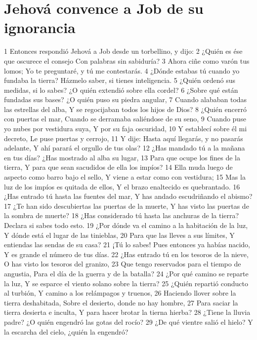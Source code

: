 \section*{Jehová convence a Job de su ignorancia}

1 Entonces respondió Jehová a Job desde un torbellino, y dijo:
2 ¿Quién es ése que oscurece el consejo
Con palabras sin sabiduría?
3 Ahora ciñe como varón tus lomos;
Yo te preguntaré, y tú me contestarás.
4 ¿Dónde estabas tú cuando yo fundaba la tierra?
Házmelo saber, si tienes inteligencia.
5 ¿Quién ordenó sus medidas, si lo sabes?
¿O quién extendió sobre ella cordel?
6 ¿Sobre qué están fundadas sus bases?
¿O quién puso su piedra angular,
7 Cuando alababan todas las estrellas del alba,
Y se regocijaban todos los hijos de Dios?
8 ¿Quién encerró con puertas el mar,
Cuando se derramaba saliéndose de su seno, 
9 Cuando puse yo nubes por vestidura suya,
Y por su faja oscuridad,
10 Y establecí sobre él mi decreto,
Le puse puertas y cerrojo,
11 Y dije: Hasta aquí llegarás, y no pasarás adelante,
Y ahí parará el orgullo de tus olas? 
12 ¿Has mandado tú a la mañana en tus días?
¿Has mostrado al alba su lugar,
13 Para que ocupe los fines de la tierra,
Y para que sean sacudidos de ella los impíos?
14 Ella muda luego de aspecto como barro bajo el sello,
Y viene a estar como con vestidura;
15 Mas la luz de los impíos es quitada de ellos,
Y el brazo enaltecido es quebrantado.
16 ¿Has entrado tú hasta las fuentes del mar,
Y has andado escudriñando el abismo?
17 ¿Te han sido descubiertas las puertas de la muerte,
Y has visto las puertas de la sombra de muerte?
18 ¿Has considerado tú hasta las anchuras de la tierra?
Declara si sabes todo esto.
19 ¿Por dónde va el camino a la habitación de la luz,
Y dónde está el lugar de las tinieblas,
20 Para que las lleves a sus límites,
Y entiendas las sendas de su casa?
21 ¡Tú lo sabes! Pues entonces ya habías nacido,
Y es grande el número de tus días.
22 ¿Has entrado tú en los tesoros de la nieve,
O has visto los tesoros del granizo,
23 Que tengo reservados para el tiempo de angustia,
Para el día de la guerra y de la batalla?
24 ¿Por qué camino se reparte la luz,
Y se esparce el viento solano sobre la tierra? 
25 ¿Quién repartió conducto al turbión,
Y camino a los relámpagos y truenos,
26 Haciendo llover sobre la tierra deshabitada, 
Sobre el desierto, donde no hay hombre,
27 Para saciar la tierra desierta e inculta,
Y para hacer brotar la tierna hierba?
28 ¿Tiene la lluvia padre?
¿O quién engendró las gotas del rocío?
29 ¿De qué vientre salió el hielo?
Y la escarcha del cielo, ¿quién la engendró?
